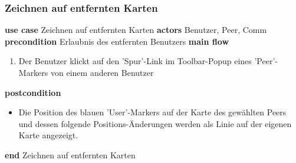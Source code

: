 \subsubsection{Zeichnen auf entfernten Karten}\label{subsubsec:uc_remmapnav}
\noindent \textbf{use case} Zeichnen auf entfernten Karten \newline
\indent \textbf{actors} \newline
\indent \indent Benutzer, Peer, Comm \newline
\indent \textbf{precondition} \newline
\indent \indent Erlaubnis des entfernten Benutzers \newline
\indent \textbf{main flow}
\begin{enumerate}[labelwidth=0pt,leftmargin=39pt,noitemsep,topsep=0pt,parsep=0pt,partopsep=0pt]
\item Der Benutzer klickt auf den 'Spur'-Link im Toolbar-Popup eines 'Peer'-Markers von einem anderen Benutzer
\end{enumerate}
\indent \indent \textbf{postcondition}
\begin{itemize}[label={},labelwidth=0pt,leftmargin=24pt,noitemsep,topsep=0pt,parsep=0pt,partopsep=0pt]
\item Die Position des blauen 'User'-Markers auf der Karte des gewählten Peers und dessen folgende Positions-Änderungen werden als Linie auf der eigenen Karte angezeigt.
\end{itemize}
\noindent \textbf{end} Zeichnen auf entfernten Karten \newline

